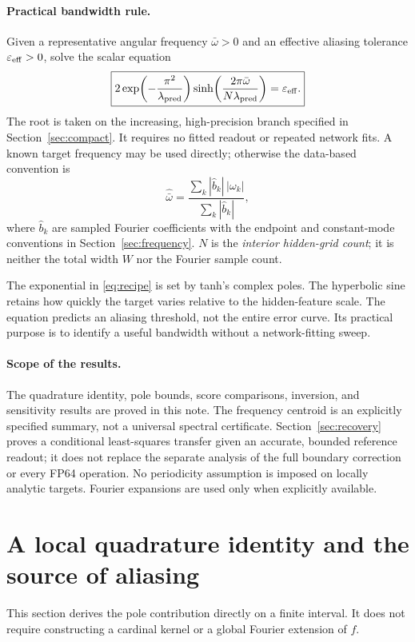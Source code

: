 \documentclass[11pt]{article}
\theoremstyle{definition}\newtheorem{definition}[theorem]{Definition}
\theoremstyle{remark}\newtheorem{remark}[theorem]{Remark}
\numberwithin{equation}{section}
\begin{document}
\paragraph{Practical bandwidth rule.}
Given a representative angular frequency $\bar\omega>0$ and an effective aliasing tolerance $\varepsilon_{\rm eff}>0$, solve the scalar equation
\begin{equation}
 \boxed{2\exp\!\left(-\frac{\pi^2}{\lambda_{\rm pred}}\right)
 \sinh\!\left(\frac{2\pi\bar\omega}{N\lambda_{\rm pred}}\right)
 =\varepsilon_{\rm eff}.}
 \label{eq:recipe}
\end{equation}
The root is taken on the increasing, high-precision branch specified in Section~\ref{sec:compact}. It requires no fitted readout or repeated network fits. A known target frequency may be used directly; otherwise the data-based convention is
\begin{equation}
 \widehat{\bar\omega}
 =\frac{\sum_k|\widehat b_k|\,|\omega_k|}{\sum_k|\widehat b_k|},
 \label{eq:centroid-summary}
\end{equation}
where $\widehat b_k$ are sampled Fourier coefficients with the endpoint and constant-mode conventions in Section~\ref{sec:frequency}. $N$ is the \emph{interior hidden-grid count}; it is neither the total width $W$ nor the Fourier sample count.

The exponential in \eqref{eq:recipe} is set by tanh's complex poles. The hyperbolic sine retains how quickly the target varies relative to the hidden-feature scale. The equation predicts an aliasing threshold, not the entire error curve. Its practical purpose is to identify a useful bandwidth without a network-fitting sweep.

\paragraph{Scope of the results.}
The quadrature identity, pole bounds, score comparisons, inversion, and sensitivity results are proved in this note. The frequency centroid is an explicitly specified summary, not a universal spectral certificate. Section~\ref{sec:recovery} proves a conditional least-squares transfer given an accurate, bounded reference readout; it does not replace the separate analysis of the full boundary correction or every FP64 operation. No periodicity assumption is imposed on locally analytic targets. Fourier expansions are used only when explicitly available.

\section{A local quadrature identity and the source of aliasing}
\label{sec:quadrature}
This section derives the pole contribution directly on a finite interval. It does not require constructing a cardinal kernel or a global Fourier extension of $f$.
\end{document}
